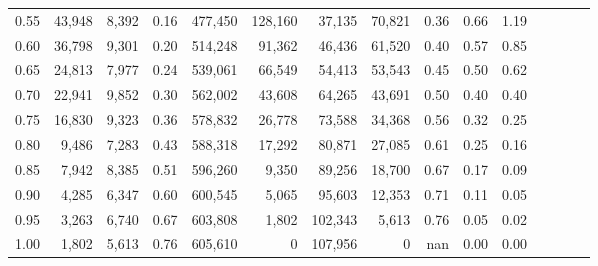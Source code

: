 \begin{tabular}{rrrcrrrrrrrrrrr}
0.55 &  43,948 &  8,392 &                                       0.16 &  477,450 &  128,160 &   37,135 &   70,821 &  0.36 &  0.66 &                         1.19 \\
0.60 &  36,798 &  9,301 &                                       0.20 &  514,248 &   91,362 &   46,436 &   61,520 &  0.40 &  0.57 &                         0.85 \\
0.65 &  24,813 &  7,977 &                                       0.24 &  539,061 &   66,549 &   54,413 &   53,543 &  0.45 &  0.50 &                         0.62 \\
0.70 &  22,941 &  9,852 &                                       0.30 &  562,002 &   43,608 &   64,265 &   43,691 &  0.50 &  0.40 &                         0.40 \\
0.75 &  16,830 &  9,323 &                                       0.36 &  578,832 &   26,778 &   73,588 &   34,368 &  0.56 &  0.32 &                         0.25 \\
0.80 &   9,486 &  7,283 &                                       0.43 &  588,318 &   17,292 &   80,871 &   27,085 &  0.61 &  0.25 &                         0.16 \\
0.85 &   7,942 &  8,385 &                                       0.51 &  596,260 &    9,350 &   89,256 &   18,700 &  0.67 &  0.17 &                         0.09 \\
0.90 &   4,285 &  6,347 &                                       0.60 &  600,545 &    5,065 &   95,603 &   12,353 &  0.71 &  0.11 &                         0.05 \\
0.95 &   3,263 &  6,740 &                                       0.67 &  603,808 &    1,802 &  102,343 &    5,613 &  0.76 &  0.05 &                         0.02 \\
1.00 &   1,802 &  5,613 &                                       0.76 &  605,610 &        0 &  107,956 &        0 &   nan &  0.00 &                         0.00 \\
\bottomrule
\end{tabular}
